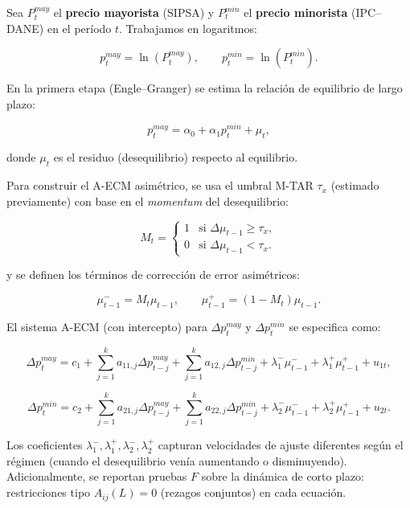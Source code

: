 \documentclass[
  12pt,
]{article}
\begin{document}
Sea \(P^{may}_t\) el \textbf{precio mayorista} (SIPSA) y \(P^{min}_t\)
el \textbf{precio minorista} (IPC--DANE) en el período \(t\). Trabajamos
en logaritmos:

\begin{equation}
p^{may}_t=\ln(P^{may}_t), 
\qquad 
p^{min}_t=\ln(P^{min}_t).
\end{equation}

En la primera etapa (Engle--Granger) se estima la relación de equilibrio
de largo plazo:

\begin{equation}
p^{may}_t = \alpha_0 + \alpha_1 p^{min}_t + \mu_t,
\end{equation}

donde \(\mu_t\) es el residuo (desequilibrio) respecto al equilibrio.

Para construir el A-ECM asimétrico, se usa el umbral M-TAR \(\tau_x\)
(estimado previamente) con base en el \emph{momentum} del desequilibrio:

\begin{equation}
M_t=
\begin{cases}
1 & \text{si } \Delta \mu_{t-1}\ge \tau_x,\\
0 & \text{si } \Delta \mu_{t-1}< \tau_x.
\end{cases}
\end{equation}

y se definen los términos de corrección de error asimétricos:

\begin{equation}
\mu^{-}_{t-1}=M_t\mu_{t-1},
\qquad
\mu^{+}_{t-1}=(1-M_t)\mu_{t-1}.
\end{equation}

El sistema A-ECM (con intercepto) para \(\Delta p^{may}_t\) y
\(\Delta p^{min}_t\) se especifica como:

\begin{equation}
\Delta p^{may}_t = c_1 
+ \sum_{j=1}^{k} a_{11,j}\Delta p^{may}_{t-j}
+ \sum_{j=1}^{k} a_{12,j}\Delta p^{min}_{t-j}
+ \lambda^-_1 \mu^{-}_{t-1}
+ \lambda^+_1 \mu^{+}_{t-1}
+ u_{1t},
\end{equation}

\begin{equation}
\Delta p^{min}_t = c_2 
+ \sum_{j=1}^{k} a_{21,j}\Delta p^{may}_{t-j}
+ \sum_{j=1}^{k} a_{22,j}\Delta p^{min}_{t-j}
+ \lambda^-_2 \mu^{-}_{t-1}
+ \lambda^+_2 \mu^{+}_{t-1}
+ u_{2t}.
\end{equation}

Los coeficientes \(\lambda^-_1,\lambda^+_1,\lambda^-_2,\lambda^+_2\)
capturan velocidades de ajuste diferentes según el régimen (cuando el
desequilibrio venía aumentando o disminuyendo). Adicionalmente, se
reportan pruebas \(F\) sobre la dinámica de corto plazo: restricciones
tipo \(A_{ij}(L)=0\) (rezagos conjuntos) en cada ecuación.
\end{document}
